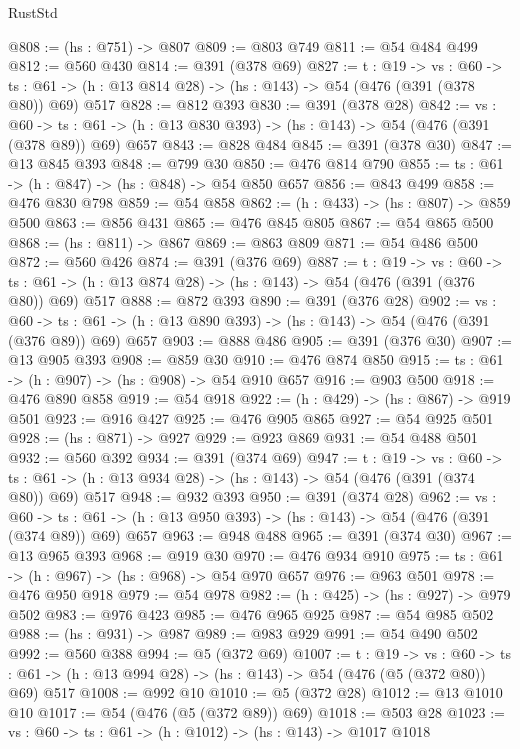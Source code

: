\begin{lexlean}{RustStd}
\begin{coremodule}
{\begin{coremodule}
{{{{{{{{{{{{{{{{{{{{{{{{{{{{{{{{{{{{{{@808 := (hs : @751) -> @807
@809 := @803 @749
@811 := @54 @484 @499
@812 := @560 @430
@814 := @391 (@378 @69)
@827 := {t : @19} ->
  {vs : @60} ->
  {ts : @61} -> (h : @13 @814 @28) -> (hs : @143) -> @54 (@476 (@391 (@378 @80)) @69) @517
@828 := @812 @393
@830 := @391 (@378 @28)
@842 := {vs : @60} ->
  {ts : @61} -> (h : @13 @830 @393) -> (hs : @143) -> @54 (@476 (@391 (@378 @89)) @69) @657
@843 := @828 @484
@845 := @391 (@378 @30)
@847 := @13 @845 @393
@848 := @799 @30
@850 := @476 @814 @790
@855 := {ts : @61} -> (h : @847) -> (hs : @848) -> @54 @850 @657
@856 := @843 @499
@858 := @476 @830 @798
@859 := @54 @858
@862 := (h : @433) -> (hs : @807) -> @859 @500
@863 := @856 @431
@865 := @476 @845 @805
@867 := @54 @865 @500
@868 := (hs : @811) -> @867
@869 := @863 @809
@871 := @54 @486 @500
@872 := @560 @426
@874 := @391 (@376 @69)
@887 := {t : @19} ->
  {vs : @60} ->
  {ts : @61} -> (h : @13 @874 @28) -> (hs : @143) -> @54 (@476 (@391 (@376 @80)) @69) @517
@888 := @872 @393
@890 := @391 (@376 @28)
@902 := {vs : @60} ->
  {ts : @61} -> (h : @13 @890 @393) -> (hs : @143) -> @54 (@476 (@391 (@376 @89)) @69) @657
@903 := @888 @486
@905 := @391 (@376 @30)
@907 := @13 @905 @393
@908 := @859 @30
@910 := @476 @874 @850
@915 := {ts : @61} -> (h : @907) -> (hs : @908) -> @54 @910 @657
@916 := @903 @500
@918 := @476 @890 @858
@919 := @54 @918
@922 := (h : @429) -> (hs : @867) -> @919 @501
@923 := @916 @427
@925 := @476 @905 @865
@927 := @54 @925 @501
@928 := (hs : @871) -> @927
@929 := @923 @869
@931 := @54 @488 @501
@932 := @560 @392
@934 := @391 (@374 @69)
@947 := {t : @19} ->
  {vs : @60} ->
  {ts : @61} -> (h : @13 @934 @28) -> (hs : @143) -> @54 (@476 (@391 (@374 @80)) @69) @517
@948 := @932 @393
@950 := @391 (@374 @28)
@962 := {vs : @60} ->
  {ts : @61} -> (h : @13 @950 @393) -> (hs : @143) -> @54 (@476 (@391 (@374 @89)) @69) @657
@963 := @948 @488
@965 := @391 (@374 @30)
@967 := @13 @965 @393
@968 := @919 @30
@970 := @476 @934 @910
@975 := {ts : @61} -> (h : @967) -> (hs : @968) -> @54 @970 @657
@976 := @963 @501
@978 := @476 @950 @918
@979 := @54 @978
@982 := (h : @425) -> (hs : @927) -> @979 @502
@983 := @976 @423
@985 := @476 @965 @925
@987 := @54 @985 @502
@988 := (hs : @931) -> @987
@989 := @983 @929
@991 := @54 @490 @502
@992 := @560 @388
@994 := @5 (@372 @69)
@1007 := {t : @19} ->
  {vs : @60} ->
  {ts : @61} -> (h : @13 @994 @28) -> (hs : @143) -> @54 (@476 (@5 (@372 @80)) @69) @517
@1008 := @992 @10
@1010 := @5 (@372 @28)
@1012 := @13 @1010 @10
@1017 := @54 (@476 (@5 (@372 @89)) @69)
@1018 := @503 @28
@1023 := {vs : @60} -> {ts : @61} -> (h : @1012) -> (hs : @143) -> @1017 @1018
}}}}}}}}}}}}}}}}}}}}}}}}}}}}}}}}}}}}}}
\end{coremodule}}
\end{coremodule}
\end{lexlean}
